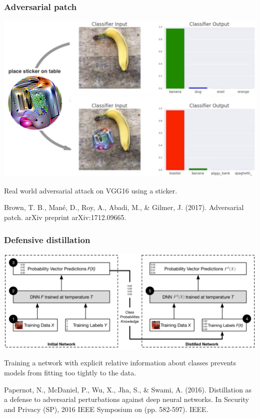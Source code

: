 \documentclass[9pt]{beamer}
\begin{document}
\begin{frame}
  \frametitle{Adversarial patch}

  \begin{center}
    \includegraphics[width = 0.8\linewidth]{images/adversarial_patch.png}
  \end{center}

  \medskip

  Real world adversarial attack on VGG16 using a sticker.

  \medskip

  {\scriptsize Brown, T. B., Mané, D., Roy, A., Abadi, M., \& Gilmer,
    J. (2017). Adversarial patch. arXiv preprint arXiv:1712.09665.}
\end{frame}

\begin{frame}
  \frametitle{Defensive distillation}

  \begin{center}
    \includegraphics[width = 0.9\linewidth]{images/distillation.png}
  \end{center}

  \medskip

  Training a network with explicit relative information about classes
  prevents models from fitting too tightly to the data.

  \bigskip

  {\scriptsize Papernot, N., McDaniel, P., Wu, X., Jha, S., \& Swami,
    A. (2016). Distillation as a defense to adversarial perturbations
    against deep neural networks. In Security and Privacy (SP), 2016
    IEEE Symposium on (pp. 582-597). IEEE.}

\end{frame}
\end{document}
